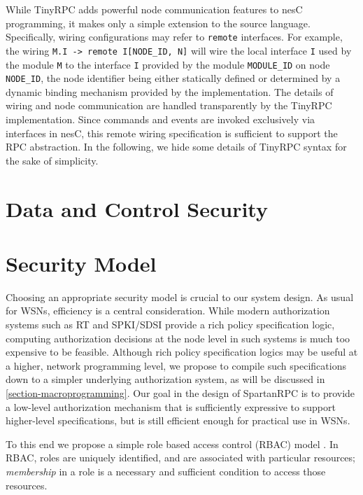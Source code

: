 While TinyRPC adds powerful node communication features to nesC programming, it makes only a
simple extension to the source language. Specifically, wiring configurations may refer to
\texttt{remote} interfaces. For example, the wiring \texttt{M.I -> remote I[NODE\_ID, N]} will
wire the local interface \texttt{I} used by the module \texttt{M} to the interface \texttt{I}
provided by the module \texttt{MODULE\_ID} on node \texttt{NODE\_ID}, the node identifier being
either statically defined or determined by a dynamic binding mechanism provided by the
implementation. The details of wiring and node communication are handled transparently by the
TinyRPC implementation. Since commands and events are invoked exclusively via interfaces in
nesC, this remote wiring specification is sufficient to support the RPC abstraction. In the
following, we hide some details of TinyRPC syntax for the sake of simplicity.

\section{Data and Control Security}

\section{Security Model}

Choosing an appropriate security model is crucial to our system design. As usual for WSNs,
efficiency is a central consideration. While modern authorization systems such as RT
\cite{Li:DRBTMF} and SPKI/SDSI \cite{RFC-2693} provide a rich policy specification logic,
computing authorization decisions at the node level in such systems is much too expensive to be
feasible. Although rich policy specification logics may be useful at a higher, network
programming level, we propose to compile such specifications down to a simpler underlying
authorization system, as will be discussed in \autoref{section-macroprogramming}. Our goal in
the design of SpartanRPC is to provide a low-level authorization mechanism that is sufficiently
expressive to support higher-level specifications, but is still efficient enough for practical
use in WSNs.

To this end we propose a simple role based access control (RBAC) model \cite{Sandhu:RBACM}. In
RBAC, roles are uniquely identified, and are associated with particular resources;
\emph{membership} in a role is a necessary and sufficient condition to access those resources.

